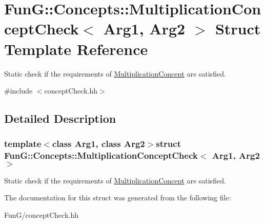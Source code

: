 \hypertarget{structFunG_1_1Concepts_1_1MultiplicationConceptCheck}{\section{Fun\-G\-:\-:Concepts\-:\-:Multiplication\-Concept\-Check$<$ Arg1, Arg2 $>$ Struct Template Reference}
\label{structFunG_1_1Concepts_1_1MultiplicationConceptCheck}
}


Static check if the requirements of \hyperlink{structFunG_1_1Concepts_1_1MultiplicationConcept}{Multiplication\-Concept} are satisfied.  




{\ttfamily \#include $<$concept\-Check.\-hh$>$}



\subsection{Detailed Description}
\subsubsection*{template$<$class Arg1, class Arg2$>$struct Fun\-G\-::\-Concepts\-::\-Multiplication\-Concept\-Check$<$ Arg1, Arg2 $>$}

Static check if the requirements of \hyperlink{structFunG_1_1Concepts_1_1MultiplicationConcept}{Multiplication\-Concept} are satisfied. 

The documentation for this struct was generated from the following file\-:\begin{DoxyCompactItemize}
\item 
Fun\-G/concept\-Check.\-hh\end{DoxyCompactItemize}
